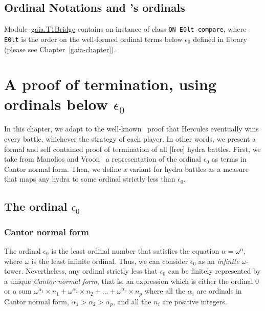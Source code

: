 \section{Ordinal Notations and \gaia's ordinals}
\gaiasign Module~\href{../theories/html/gaia.T1Bridge.html}{gaia.T1Bridge} contains an instance of class \texttt{ON E0lt compare}, where \texttt{E0lt} is the order on the well-formed ordinal terms below $\epsilon_0$ defined in \gaiaHydras library (please see Chapter~\ref{gaia-chapter}).









\chapter[A proof of termination, using epsilon0]{A proof of termination, using ordinals below \texorpdfstring{$\epsilon_0$}{Epsilon0}}

\label{cnf-math-def}
\label{chap:T1}

In this chapter, we adapt to \coq{} the well-known~\cite{KP82}  proof that Hercules eventually wins every battle, whichever the strategy  of each player.
In other words, we present  a formal and self contained proof of termination  of all [free] hydra battles.
First, we take from Manolios and Vroon~\cite{Manolios2005} a representation of the ordinal $\epsilon_0$ as terms in Cantor normal form. Then, we define a variant for hydra battles as a measure that maps any hydra to some ordinal strictly less than $\epsilon_0$.



\section{The ordinal \texorpdfstring{\(\epsilon_0\)}{epsilon0}}
\label{sec:epsilon0-intro}

\subsection{Cantor normal form}

The ordinal \(\epsilon_0\) is the least ordinal number that satisfies 
the equation \(\alpha = \omega^\alpha\), where \(\omega\) is 
the least infinite ordinal. Thus, we can consider \(\epsilon_0\) as an
\emph{infinite} \(\omega\)-tower.
Nevertheless, 
any ordinal strictly less that \(\epsilon_0\) 
can be finitely represented by a unique  \emph{Cantor normal form}, 
that is, an expression  which is either  the ordinal \(0\) or 
a sum  \(\omega^{\alpha_1} \times n_1 + \omega^{\alpha_2} \times n_2 + 
  \dots + \omega^{\alpha_p} \times n_p\) where all the \(\alpha_i\) 
are ordinals in Cantor  normal form, \(\alpha_1 > \alpha_2 > \alpha_p\), 
and all the \(n_i\) are positive integers.

